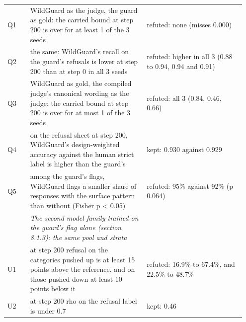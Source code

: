 \documentclass[11pt]{article}
\begin{document}
\begin{longtable}{@{}>{\raggedright\arraybackslash}p{0.093\linewidth}>{\raggedright\arraybackslash}p{0.461\linewidth}>{\raggedright\arraybackslash}p{0.392\linewidth}@{}}
\hspace{0pt}Q1 & \hspace{0pt}WildGuard as the judge, the guard as gold: the carried bound at step 200 is over for at least 1 of the 3 seeds & \hspace{0pt}refuted: none (misses 0.000) \\
\hspace{0pt}Q2 & \hspace{0pt}the same: WildGuard's recall on the guard's refusals is lower at step 200 than at step 0 in all 3 seeds & \hspace{0pt}refuted: higher in all 3 (0.88 to 0.94, 0.94 and 0.91) \\
\hspace{0pt}Q3 & \hspace{0pt}WildGuard as gold, the compiled judge's canonical wording as the judge: the carried bound at step 200 is over for at most 1 of the 3 seeds & \hspace{0pt}refuted: all 3 (0.84, 0.46, 0.66) \\
\hspace{0pt}Q4 & \hspace{0pt}on the refusal sheet at step 200, WildGuard's design-weighted accuracy against the human strict label is higher than the guard's & \hspace{0pt}kept: 0.930 against 0.929 \\
\hspace{0pt}Q5 & \hspace{0pt}among the guard's flags, WildGuard flags a smaller share of responses with the surface pattern than without (Fisher p < 0.05) & \hspace{0pt}refuted: 95\% against 92\% (p 0.064) \\
 & \hspace{0pt}\emph{The second model family trained on the guard's flag alone (section 8.1.3): the same pool and strata} &  \\
\hspace{0pt}U1 & \hspace{0pt}at step 200 refusal on the categories pushed up is at least 15 points above the reference, and on those pushed down at least 10 points below it & \hspace{0pt}refuted: 16.9\% to 67.4\%, and 22.5\% to 48.7\% \\
\hspace{0pt}U2 & \hspace{0pt}at step 200 rho on the refusal label is under 0.7 & \hspace{0pt}kept: 0.46 \\

\end{longtable}
\end{document}

